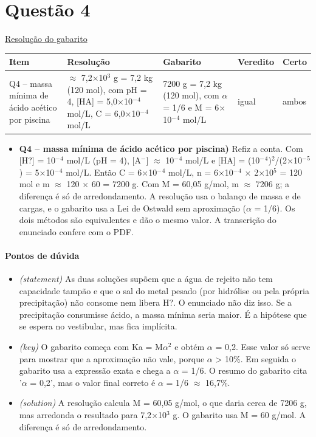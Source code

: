 \documentclass{article}%
\begin{document}
\section*{Questão 4}%
\href{https://poliedroresolve.sistemapoliedro.com.br/vestibulares/ime/2026/ime-2-fase-dia-3-25-10-2025-2-fase-dia-3/dissertativa-4-quimica-2-fase-dia-3-ime-2026}{Resolução do gabarito}\par\smallskip%
\begin{longtable}{@{}p{} p{} p{} p{} p{}@{}}\toprule Item & Resolução & Gabarito & Veredito & Certo \\ \midrule
Q4 -- massa mínima de ácido acético por piscina & $\approx$ 7,2$\times$10$^3$ g = 7,2 kg (120 mol), com pH = 4, {[}HA{]} = 5,0$\times$10$^{-}$$^{4}$ mol/L, C = 6,0$\times$10$^{-}$$^{4}$ mol/L & 7200 g = 7,2 kg (120 mol), com $\alpha$ = 1/6 e M = 6$\times$10$^{-}$$^{4}$ mol/L & igual & ambos \\
\bottomrule\end{longtable}%
\begin{itemize}%
\item%
\textbf{Q4 -- massa mínima de ácido acético por piscina)} Refiz a conta. Com {[}H?{]} = 10$^{-}$$^{4}$ mol/L (pH = 4), {[}A$^{-}${]} $\approx$ 10$^{-}$$^{4}$ mol/L e {[}HA{]} = (10$^{-}$$^{4}$)$^2$/(2$\times$10$^{-}$$^{5}$) = 5$\times$10$^{-}$$^{4}$ mol/L. Então C = 6$\times$10$^{-}$$^{4}$ mol/L, n = 6$\times$10$^{-}$$^{4}$ $\times$ 2$\times$10$^{5}$ = 120 mol e m $\approx$ 120 $\times$ 60 = 7200 g. Com M = 60,05 g/mol, m $\approx$ 7206 g; a diferença é só de arredondamento. A resolução usa o balanço de massa e de cargas, e o gabarito usa a Lei de Ostwald sem aproximação ($\alpha$ = 1/6). Os dois métodos são equivalentes e dão o mesmo valor. A transcrição do enunciado confere com o PDF.%
\end{itemize}%
\paragraph{Pontos de dúvida}%
\begin{itemize}%
\item%
\textit{(statement)} As duas soluções supõem que a água de rejeito não tem capacidade tampão e que o sal do metal pesado (por hidrólise ou pela própria precipitação) não consome nem libera H?. O enunciado não diz isso. Se a precipitação consumisse ácido, a massa mínima seria maior. É a hipótese que se espera no vestibular, mas fica implícita.%
\item%
\textit{(key)} O gabarito começa com Ka = M$\alpha$$^2$ e obtém $\alpha$ = 0,2. Esse valor só serve para mostrar que a aproximação não vale, porque $\alpha$ > 10\%. Em seguida o gabarito usa a expressão exata e chega a $\alpha$ = 1/6. O resumo do gabarito cita '$\alpha$ = 0,2', mas o valor final correto é $\alpha$ = 1/6 $\approx$ 16,7\%.%
\item%
\textit{(solution)} A resolução calcula M = 60,05 g/mol, o que daria cerca de 7206 g, mas arredonda o resultado para 7,2$\times$10$^3$ g. O gabarito usa M = 60 g/mol. A diferença é só de arredondamento.%
\end{itemize}%
\end{document}
